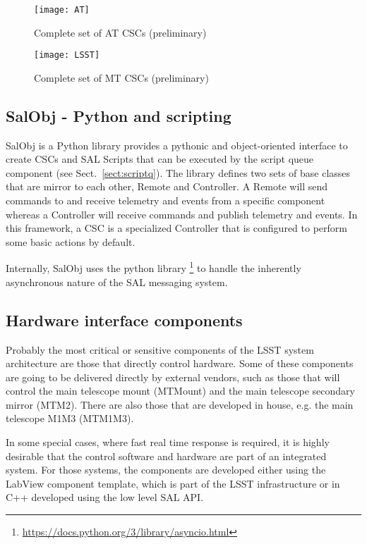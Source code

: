 \begin{figure}
\begin{center}
\texttt{[image: AT]}
\caption{Complete set of AT CSCs (preliminary)\label{fig:atcscs}}
\end{center}
\end{figure}

\begin{figure}
\begin{center}
\texttt{[image: LSST]}
\caption{Complete set of MT CSCs (preliminary)\label{fig:mtcscs}}
\end{center}
\end{figure}

\subsection{SalObj - Python and scripting }\label{sect:salobj}
SalObj is a Python library provides a pythonic and object-oriented interface to create CSCs and SAL Scripts that can be executed by the script queue component (see Sect.~\ref{sect:scriptq}). The library defines two sets of base classes that are mirror to each other, Remote and Controller. A Remote will send commands to and receive telemetry and events from a specific component whereas a Controller will receive commands and publish telemetry and events. In this framework, a CSC is a specialized Controller that is configured to perform some basic actions by default. 

Internally, SalObj uses the python library \asyncio\footnote{\url{https://docs.python.org/3/library/asyncio.html}} to handle the inherently asynchronous nature of the SAL messaging system.

\subsection{Hardware interface components}\label{sect:hardware_csc}
Probably the most critical or sensitive components of the LSST system architecture are those that directly control hardware. Some of these components are going to be delivered directly by external vendors, such as those that will control the main telescope mount (MTMount) and the main telescope secondary mirror (MTM2). There are also those that are developed in house, e.g. the main telescope M1M3 (MTM1M3).

In some special cases, where fast real time response is required, it is highly desirable that the control software and hardware are part of an integrated system. For those systems, the components are developed either using the LabView component template, which is part of the LSST infrastructure or in C++ developed using the low level SAL API.

